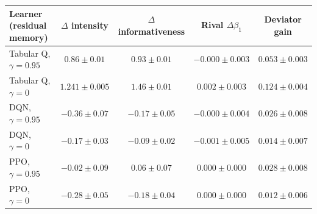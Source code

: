 \begin{tabular}{lcccc}
\toprule
Learner (residual memory) & $\Delta$ intensity & $\Delta$ informativeness & Rival $\Delta\beta_1$ & Deviator gain \\
\midrule
Tabular Q, $\gamma=0.95$ & $0.86 \pm 0.01$ & $0.93 \pm 0.01$ & $-0.000 \pm 0.003$ & $0.053 \pm 0.003$ \\
Tabular Q, $\gamma=0$ & $1.241 \pm 0.005$ & $1.46 \pm 0.01$ & $0.002 \pm 0.003$ & $0.124 \pm 0.004$ \\
DQN, $\gamma=0.95$ & $-0.36 \pm 0.07$ & $-0.17 \pm 0.05$ & $-0.000 \pm 0.004$ & $0.026 \pm 0.008$ \\
DQN, $\gamma=0$ & $-0.17 \pm 0.03$ & $-0.09 \pm 0.02$ & $-0.001 \pm 0.005$ & $0.014 \pm 0.007$ \\
PPO, $\gamma=0.95$ & $-0.02 \pm 0.09$ & $0.06 \pm 0.07$ & $0.000 \pm 0.000$ & $0.028 \pm 0.008$ \\
PPO, $\gamma=0$ & $-0.28 \pm 0.05$ & $-0.18 \pm 0.04$ & $0.000 \pm 0.000$ & $0.012 \pm 0.006$ \\
\bottomrule
\end{tabular}